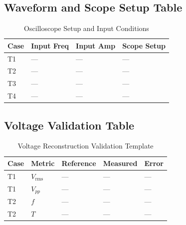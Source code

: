 \documentclass[conference]{IEEEtran}
\begin{document}
\subsection{Waveform and Scope Setup Table}
\begin{table}[ht]
\caption{Oscilloscope Setup and Input Conditions}
\label{tab:test-setup}
\centering
\begin{tabularx}{\columnwidth}{>{\raggedright\arraybackslash}p{} >{\raggedright\arraybackslash}p{} >{\raggedright\arraybackslash}p{} X}
\toprule
\textbf{Case} & \textbf{Input Freq} & \textbf{Input Amp} & \textbf{Scope Setup} \\
\midrule
T1 & --- & --- & --- \\
T2 & --- & --- & --- \\
T3 & --- & --- & --- \\
T4 & --- & --- & --- \\
\bottomrule
\end{tabularx}
\end{table}

\subsection{Voltage Validation Table}
\begin{table}[ht]
\caption{Voltage Reconstruction Validation Template}
\label{tab:voltage-validation}
\centering
\begin{tabularx}{\columnwidth}{>{\raggedright\arraybackslash}p{} >{\raggedright\arraybackslash}p{} >{\raggedright\arraybackslash}p{} >{\raggedright\arraybackslash}p{} X}
\toprule
\textbf{Case} & \textbf{Metric} & \textbf{Reference} & \textbf{Measured} & \textbf{Error} \\
\midrule
T1 & $V_{\mathrm{rms}}$ & --- & --- & --- \\
T1 & $V_{pp}$ & --- & --- & --- \\
T2 & $f$ & --- & --- & --- \\
T2 & $T$ & --- & --- & --- \\
\bottomrule
\end{tabularx}
\end{table}
\end{document}
